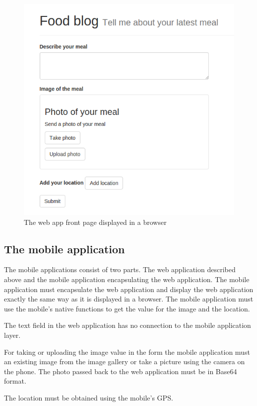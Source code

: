 \begin{figure}[h!]
	\centering
    \includegraphics[width=120mm,natwidth=800,natheight=600]{./img/webAppFrontPage.png}
    \caption{The web app front page displayed in a browser}
    \label{fig:nativeuml}
\end{figure}

\subsection{The mobile application} \label{subsection-mobile-application}
The mobile applications consist of two parts. The web application described above and the mobile application encapsulating the web application. The mobile application must encapsulate the web application and display the web application exactly the same way as it is displayed in a browser. The mobile application must use the mobile’s native functions to get the value for the image and the location.

The text field in the web application has no connection to the mobile application layer. 

For taking or uploading the image value in the form the mobile application must an existing image from the image gallery or take a picture using the camera on the phone. The photo passed back to the web application must be in Base64 format. 

The location must be obtained using the mobile’s GPS. 


